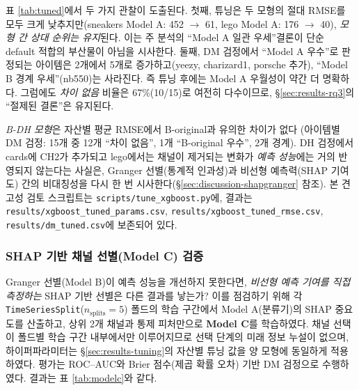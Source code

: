 \documentclass[11pt, a4paper, twocolumn]{article}
\begin{document}
표 \ref{tab:tuned}에서 두 가지 관찰이 도출된다. 첫째, 튜닝은 두 모형의
절대 RMSE를 모두 크게 낮추지만(sneakers Model A: 452 $\rightarrow$ 61,
lego Model A: 176 $\rightarrow$ 40), \emph{모형 간 상대 순위는 유지}된다.
이는 주 분석의 ``Model A 일관 우세''결론이 단순 default 적합의 부산물이
아님을 시사한다. 둘째, DM 검정에서 ``Model A 우수''로 판정되는 아이템은
2개에서 5개로 증가하고(\textsf{yeezy}, \textsf{charizard1},
\textsf{porsche} 추가), ``Model B 경계 우세''(\textsf{nb550})는 사라진다.
즉 튜닝 후에는 Model A 우월성이 약간 더 명확하다. 그럼에도 \emph{차이
없음} 비율은 67\%(10/15)로 여전히 다수이므로, \S\ref{sec:results-rq3}의
``절제된 결론''은 유지된다.

\emph{B-DH 모형}은 자산별 평균 RMSE에서 B-original과 유의한 차이가 없다
(아이템별 DM 검정: 15개 중 12개 ``차이 없음'', 1개 ``B-original 우수'',
2개 경계). DH 검정에서 cards에 CH2가 추가되고 lego에서는 채널이 제거되는
변화가 \emph{예측 성능}에는 거의 반영되지 않는다는 사실은, Granger
선별(통계적 인과성)과 비선형 예측력(SHAP 기여도) 간의 비대칭성을 다시
한 번 시사한다(\S\ref{sec:discussion-shapgranger} 참조). 본 견고성 검토
스크립트는 \texttt{scripts/tune\_xgboost.py}에, 결과는
\texttt{results/xgboost\_tuned\_params.csv}, \texttt{results/xgboost\_tuned\_rmse.csv},
\texttt{results/dm\_tuned.csv}에 보존되어 있다.

\subsubsection*{SHAP 기반 채널 선별(Model C) 검증}
\label{sec:results-modelc}

Granger 선별(Model B)이 예측 성능을 개선하지 못한다면, \emph{비선형
예측 기여를 직접 측정하는} SHAP 기반 선별은 다른 결과를 낳는가? 이를
점검하기 위해 각 \texttt{TimeSeriesSplit}($n_{\text{splits}}=5$) 폴드의
학습 구간에서 Model A(분류기)의 SHAP 중요도를 산출하고, 상위 2개 채널과
통제 피처만으로 \textbf{Model C}를 학습하였다. 채널 선택이 폴드별 학습
구간 내부에서만 이루어지므로 선택 단계의 미래 정보 누설이 없으며,
하이퍼파라미터는 \S\ref{sec:results-tuning}의 자산별 튜닝 값을 양
모형에 동일하게 적용하였다. 평가는 ROC--AUC와 Brier 점수(제곱 확률
오차) 기반 DM 검정으로 수행하였다. 결과는 표 \ref{tab:modelc}와 같다.
\end{document}
